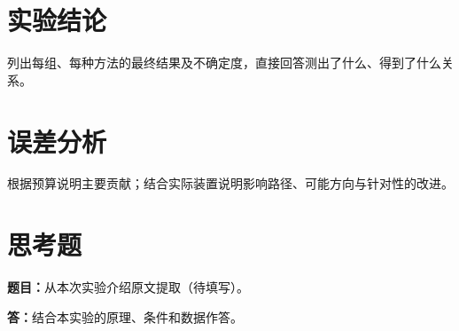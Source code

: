 \documentclass[12pt,a4paper,fontset=fandol]{ctexart}
\begin{document}
\section{实验结论}
列出每组、每种方法的最终结果及不确定度，直接回答测出了什么、得到了什么关系。

\section{误差分析}
根据预算说明主要贡献；结合实际装置说明影响路径、可能方向与针对性的改进。

\section{思考题}
\noindent\textbf{题目：}从本次实验介绍原文提取（待填写）。

\noindent\textbf{答：}结合本实验的原理、条件和数据作答。
\end{document}
